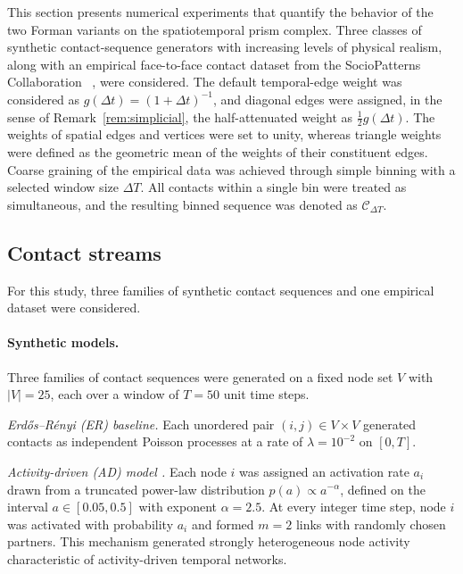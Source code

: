 \documentclass[
    pre,
    twocolumn,
    superscriptaddress,
    showpacs,
    nofootinbib,
    amsmath,
    amssymb,
    floatfix
]{revtex4-2}
\newcommand{\half}{\tfrac{1}{2}}
\newcommand{\dt}{\Delta t}
\theoremstyle{plain} %
\theoremstyle{definition} %
\begin{document}
This section presents numerical experiments that quantify the behavior of the two Forman variants on the spatiotemporal prism complex.
Three classes of synthetic contact-sequence generators with increasing levels of physical realism, along with an empirical face-to-face contact dataset from the SocioPatterns Collaboration ~\cite{Cattuto2010}, were considered.
The default temporal-edge weight was considered as $g(\dt) = (1+\dt)^{-1}$, and diagonal edges were assigned, in the sense of Remark~\ref{rem:simplicial}, the half-attenuated weight as
$\half g(\dt)$.  
The weights of spatial edges and vertices were set to unity, whereas triangle weights were defined as the geometric mean of the weights of their constituent edges.
Coarse graining of the empirical data was achieved through simple binning with a selected window size $\Delta T$. All contacts within a single bin were treated as simultaneous, and the resulting binned sequence was denoted as $\mathcal{C}_{\Delta T}$.

\subsection{Contact streams}\label{ssec:streams}

For this study, three families of synthetic contact sequences and one empirical dataset were considered.

\paragraph{Synthetic models.}
Three families of contact sequences were generated on a fixed node set $V$ with $|V|=25$, each over a window of $T=50$ unit time steps.

\textit{Erd\H os--R\'enyi (ER) baseline.}
Each unordered pair $(i,j) \in V \times V$ generated contacts as independent Poisson processes at a rate of $\lambda=10^{-2}$ on $[0,T]$.

\textit{Activity-driven (AD) model \cite{Perra2012}.}
Each node $i$ was assigned an activation rate $a_i$ drawn from a truncated power-law distribution $p(a)\propto a^{-\alpha}$, defined on the interval $a\in[0.05,0.5]$ with exponent $\alpha=2.5$.
At every integer time step, node $i$ was activated with probability $a_i$ and formed $m=2$ links with randomly chosen partners.
This mechanism generated strongly heterogeneous node activity characteristic of activity-driven temporal networks.
\end{document}
